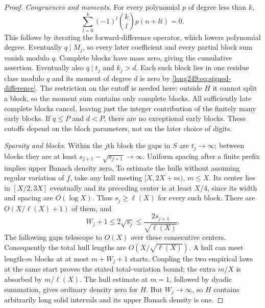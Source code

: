 \documentclass[11pt]{article}
\theoremstyle{plain}
\theoremstyle{definition}
\theoremstyle{remark}
\begin{document}
\begin{proof}
\emph{Congruences and moments.} For every polynomial $p$ of degree less
than $k$,
\begin{equation}\label{long249:eq:signed-difference}
 \sum_{l=0}^k(-1)^l\binom kl p(n+lt)=0.
\end{equation}
This follows by iterating the forward-difference operator, which lowers
polynomial degree. Eventually $q\mid M_j$, so every later coefficient
and every partial block sum vanish modulo $q$. Complete blocks have
mass zero, giving the cumulative assertion. Eventually also $q\mid t_j$
and $k_j>d$. Each such block lies in one residue class modulo $q$ and
its moment of degree $d$ is zero by \eqref{long249:eq:signed-difference}.
The restriction on the cutoff is needed here: outside $H$ it cannot
split a block, so the moment sum contains only complete blocks.
All sufficiently late complete blocks cancel, leaving just the integer
contribution of the finitely many early blocks. If $q\le P$ and $d<P$, there are no
exceptional early blocks. These cutoffs depend on the block parameters,
not on the later choice of digits.

\emph{Sparsity and blocks.} Within the $j$th block the gaps in $S$ are
$t_j\to\infty$; between blocks they are at least
$s_{j+1}-\sqrt{s_{j+1}}\to\infty$. Uniform spacing after a finite prefix
implies upper Banach density zero. To estimate the hulls without assuming
regular variation of $f$, take any hull meeting $[X,2X+m)$, $m\le X$.
Its center lies in $[X/2,3X]$ eventually and its preceding center is at
least $X/4$, since its width and spacing are $O(\log X)$.
Thus $s_j\ge\ell(X)$ for every such block. There are
$O(X/\ell(X)+1)$ of them, and
\[
 W_j+1\le2\sqrt{s_j}\le\frac{2s_{j+1}}{\sqrt{\ell(X)}}.
\]
The following gaps telescope to $O(X)$ over these consecutive centers.
Consequently the total hull lengths are $O(X/\sqrt{\ell(X)})$.
A hull can meet length-$m$ blocks at at most $m+W_j+1$ starts. Coupling
the two empirical laws at the same start proves the stated total-variation
bound; the extra $m/X$ is absorbed by $m/\ell(X)$.
The hull estimate at $m=1$, followed by dyadic summation, gives ordinary
density zero for $H$. But $W_j\to\infty$, so $H$ contains arbitrarily
long solid intervals and its upper Banach density is one.


\end{proof}
\end{document}
